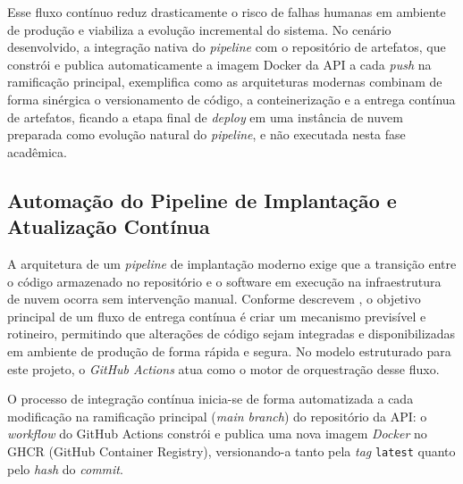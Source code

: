 Esse fluxo contínuo reduz drasticamente o risco de falhas humanas em ambiente de produção e viabiliza a evolução incremental do sistema. No cenário desenvolvido, a integração nativa do \textit{pipeline} com o repositório de artefatos, que constrói e publica automaticamente a imagem Docker da API a cada \textit{push} na ramificação principal, exemplifica como as arquiteturas modernas combinam de forma sinérgica o versionamento de código, a conteinerização e a entrega contínua de artefatos, ficando a etapa final de \textit{deploy} em uma instância de nuvem preparada como evolução natural do \textit{pipeline}, e não executada nesta fase acadêmica.

\subsection{Automação do Pipeline de Implantação e Atualização Contínua}

A arquitetura de um \textit{pipeline} de implantação moderno exige que a transição entre o código armazenado no repositório e o software em execução na infraestrutura de nuvem ocorra sem intervenção manual. Conforme descrevem , o objetivo principal de um fluxo de entrega contínua é criar um mecanismo previsível e rotineiro, permitindo que alterações de código sejam integradas e disponibilizadas em ambiente de produção de forma rápida e segura. No modelo estruturado para este projeto, o \textit{GitHub Actions} atua como o motor de orquestração desse fluxo.

O processo de integração contínua inicia-se de forma automatizada a cada modificação na ramificação principal (\textit{main branch}) do repositório da API: o \textit{workflow} do GitHub Actions constrói e publica uma nova imagem \textit{Docker} no GHCR (GitHub Container Registry), versionando-a tanto pela \textit{tag} \texttt{latest} quanto pelo \textit{hash} do \textit{commit}.


